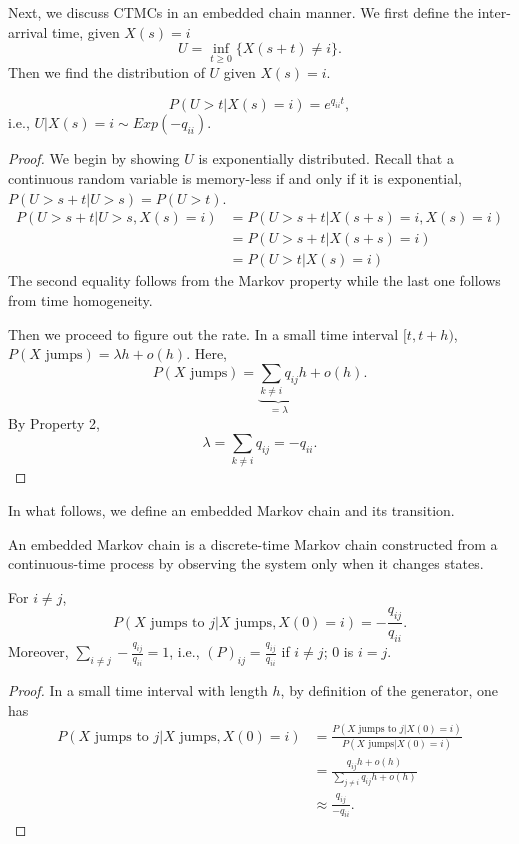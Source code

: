 \documentclass[11pt,twoside]{article}
\begin{document}
Next, we discuss CTMCs in an embedded chain manner. We first define the inter-arrival time, given $X(s)=i$
\[
U=\inf_{t\geq 0}\{X(s+t) \neq i\}.
\]
Then we find the distribution of $U$ given $X(s)=i$.

\begin{theorem}
    \[
    P(U>t | X(s)=i) = e^{q_{ii}t},
    \]
    i.e., $U  | X(s)=i \sim Exp(-q_{ii})$.
\end{theorem}

\begin{proof}
    We begin by showing $U$ is exponentially distributed. Recall that a continuous random variable is memory-less if and only if it is exponential, $P(U>s+t | U>s) = P(U>t)$. 
    \begin{align*}
        P(U>s+t | U>s, X(s)=i) &= P(U>s+t | X(s+s)=i, X(s)=i) \\
        &= P(U>s+t | X(s+s)=i) \\
        &= P(U>t | X(s)=i)
    \end{align*}
    The second equality follows from the Markov property while the last one follows from time homogeneity.

    Then we proceed to figure out the rate. In a small time interval $[t,t+h)$, 
    $P(X \text{ jumps}) = \lambda h +o(h)$. Here,
    \[
    P(X \text{ jumps}) = \underbrace{\sum_{k \neq i}q_{ij}}_{=\lambda}h + o(h).
    \]
    By Property 2, 
    \[
    \lambda = \sum_{k \neq i}q_{ij} = - q_{ii}.
    \]
\end{proof}

In what follows, we define an embedded Markov chain and its transition. 

\begin{definition}
    An embedded Markov chain is a discrete-time Markov chain constructed from a continuous-time process by observing the system only when it changes states.
\end{definition}

\begin{theorem}
For $i \neq j$,
    \[
    P(X \text{ jumps to } j |X \text{ jumps}, X(0) = i) = -\frac{q_{ij}}{q_{ii}}.
    \]
    Moreover, $\sum_{i \neq j} -\frac{q_{ij}}{q_{ii}} = 1$, i.e., $(P)_{ij} = \frac{q_{ij}}{q_{ii}}$ if $i \neq j$; 0 is $i=j$.
\end{theorem}

\begin{proof}
    In a small time interval with length $h$, by definition of the generator, one has
    \begin{align*}
        P(X \text{ jumps to } j |X \text{ jumps}, X(0) = i) &= \frac{P(X \text{ jumps to } j | X(0) = i)}{P(X \text{ jumps} | X(0) = i)} \\
        &= \frac{q_{ij}h+o(h)}{\sum_{j \neq i}q_{ij}h+o(h)} \\
        & \approx  \frac{q_{ij}}{-q_{ii}}. 
     \end{align*}
\end{proof}
\end{document}
